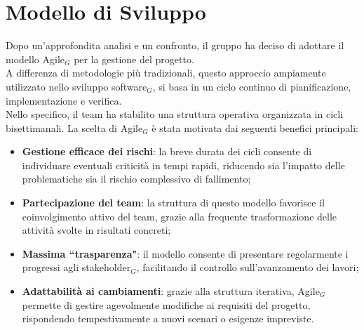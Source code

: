 \section{Modello di Sviluppo}
Dopo un'approfondita analisi e un confronto, il gruppo ha deciso di adottare il modello Agile$_G$ per la gestione del progetto.\\
A differenza di metodologie più tradizionali, questo approccio ampiamente utilizzato nello sviluppo software$_G$, si basa in un ciclo continuo di pianificazione, implementazione e verifica.\\
Nello specifico, il team ha stabilito una struttura operativa organizzata in cicli bisettimanali. La scelta di Agile$_G$ è stata motivata dai seguenti benefici principali: 
\begin{itemize}[topsep=1pt, itemsep=1pt]
    \item \textbf{Gestione efficace dei rischi}: la breve durata dei cicli consente di individuare eventuali criticità in tempi rapidi, riducendo sia l’impatto delle problematiche sia il rischio complessivo di fallimento;
    \item \textbf{Partecipazione del team}: la struttura di questo modello favorisce il coinvolgimento attivo del team, grazie alla frequente trasformazione delle attività svolte in risultati concreti;
    \item \textbf{Massima ``trasparenza"}: il modello consente di presentare regolarmente i progressi agli stakeholder$_G$, facilitando il controllo sull'avanzamento dei lavori;
    \item \textbf{Adattabilità ai cambiamenti}: grazie alla struttura iterativa, Agile$_G$ permette di gestire agevolmente modifiche ai requisiti del progetto, rispondendo tempestivamente a nuovi scenari o esigenze impreviste.
\end{itemize}